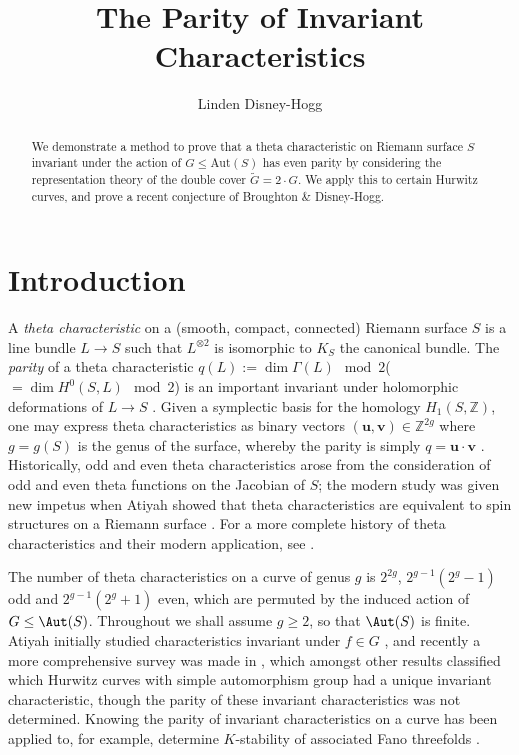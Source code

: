 \documentclass{amsart}
\title{The Parity of Invariant Characteristics}
\author[Linden Disney-Hogg]{Linden Disney-Hogg \orcidA{}}
\begin{document}
\begin{abstract}
    We demonstrate a method to prove that a theta characteristic on Riemann surface $S$ invariant under the action of $G \leq \mathrm{Aut}(S)$ has even parity by considering the representation theory of the double cover $\tilde{G} = 2 \cdot G$. We apply this to certain Hurwitz curves, and prove a recent conjecture of Broughton \& Disney-Hogg. 
\end{abstract}

\maketitle

\section{Introduction}

A \textit{theta characteristic} on a (smooth, compact, connected) Riemann surface $S$ is a line bundle $L \to S$ such that $L^{\otimes 2}$ is isomorphic to $K_S$ the canonical bundle. The \textit{parity} of a theta characteristic $q(L) := \dim \Gamma(L) \mod 2$($=\dim H^0(S, L) \mod 2$) is an important invariant under holomorphic deformations of $L \to S$ \cite{Atiyah1971}. Given a symplectic basis for the homology $H_1(S, \mathbb{Z})$, one may express theta characteristics as binary vectors $(\bm{u}, \bm{v}) \in \mathbb{Z}^{2g}$ where $g=g(S)$ is the genus of the surface, whereby the parity is simply $q = \bm{u} \cdot \bm{v}$ \cite{Johnson1980}. Historically, odd and even theta characteristics arose from the consideration of odd and even theta functions on the Jacobian of $S$; the modern study was given new impetus when Atiyah showed that theta characteristics are equivalent to spin structures on a Riemann surface \cite{Atiyah1971}. For a more complete history of theta characteristics and their modern application, see \cite{Farkas2012}.  


The number of theta characteristics on a curve of genus $g$ is $2^{2g}$, $2^{g-1}(2^g-1)$ odd and $2^{g-1}(2^g+1)$ even, which are permuted by the induced action of $G \leq \Aut(S)$. Throughout we shall assume $g \geq 2$, so that $\Aut(S)$ is finite. Atiyah initially studied characteristics invariant under $f \in G$ \cite{Atiyah1971}, and recently a more comprehensive survey was made in \cite{Braden2025}, which amongst other results classified which Hurwitz curves with simple automorphism group had a unique invariant characteristic, though the parity of these invariant characteristics was not determined. Knowing the parity of invariant characteristics on a curve has been applied to, for example, determine $K$-stability of associated Fano threefolds \cite{Cheltsov2024}. 
\end{document}
